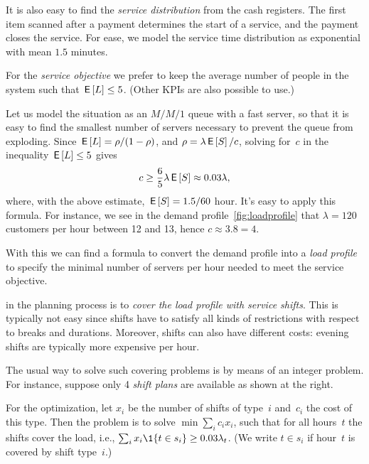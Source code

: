 \documentclass[queueing-book.tex]{subfiles}
\begin{document}
It is also easy to find the\emph{ service distribution} from the cash registers.
The first item scanned after a payment determines the start of a service, and the payment closes the service. For ease, we model the service time distribution as exponential with mean $1.5$ minutes.

For the \emph{service objective} we prefer to keep the average number of people in the system such that $\,\mathsf{E}\left[L\right] \leq 5$. (Other KPIs are also possible to use.)

Let us model the situation as an $M/M/1$ queue with a fast server, so that it is easy to find the smallest number of servers necessary to prevent the queue from exploding.
Since $\,\mathsf{E}\left[L\right] = \rho/(1-\rho)$, and $\rho=\lambda \,\mathsf{E}\left[S\right] /c$, solving for~$c$ in the inequality $\,\mathsf{E}\left[L\right] \leq 5$ gives
\begin{equation*}
c \geq \frac 6 5 \lambda \,\mathsf{E}\left[S\right] \approx 0.03 \lambda,
\end{equation*}
where, with  the above estimate, $\,\mathsf{E}\left[S\right]=1.5/60$ hour.
It's easy to apply this formula. For instance,  we see in the demand profile~\cref{fig:loadprofile} that $\lambda= 120$ customers per hour between 12 and 13, hence $c\approx 3.8 = 4$.

With this we can find a formula to convert the demand profile into a \emph{load profile} to specify the minimal number of servers per hour needed to meet the service objective.


 in the planning process is to \emph{cover the load profile with service shifts}.
This is typically not easy since shifts have to satisfy all kinds of restrictions with respect to breaks and durations.  Moreover, shifts can also have different costs: evening shifts are typically  more expensive per hour.

The usual way to solve such covering problems is by means of an integer
problem. For instance, suppose only 4 \emph{shift plans} are available as shown at the right.

For the optimization, let $x_i$ be the number of shifts of type~$i$ and~$c_i$ the cost of this type.
Then the problem is to solve $\min \sum_i c_i x_i$,
such that for all hours~$t$ the shifts cover the load, i.e., $\sum_i x_i \1{t \in s_i} \geq 0.03 \lambda_t$.
(We write $t\in s_i$ if hour~$t$ is covered by shift type~$i$.)
\end{document}

